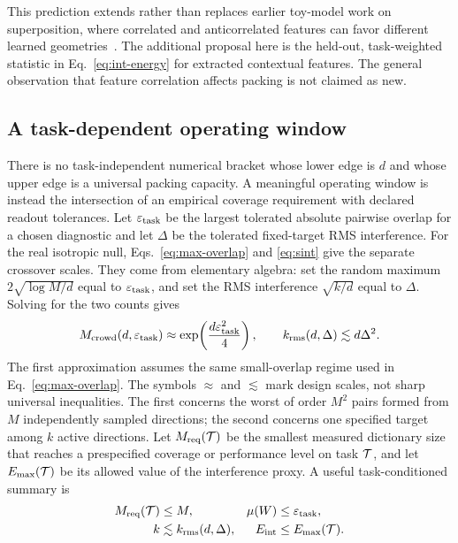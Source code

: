 \documentclass[
  aps,
  reprint,
  superscriptaddress,
  floatfix,
  nofootinbib,
  longbibliography
]{revtex4-2}
\newcommand{\Msem}{M}
\newcommand{\Eint}{E_{\mathrm{int}}}
\begin{document}
This prediction extends rather than replaces earlier toy-model work on
superposition, where correlated and anticorrelated features can favor different
learned geometries~\cite{elhage2022superposition}.  The additional proposal
here is the held-out, task-weighted statistic in Eq.~\eqref{eq:int-energy} for
extracted contextual features.  The general observation that feature
correlation affects packing is not claimed as new.

\subsection{A task-dependent operating window}
\label{sec:operating-criterion}

There is no task-independent numerical bracket whose lower edge is $d$ and
whose upper edge is a universal packing capacity.  A meaningful operating
window is instead the intersection of an empirical coverage requirement with
declared readout tolerances.  Let $\varepsilon_{\rm task}$ be the largest
tolerated absolute pairwise overlap for a chosen diagnostic and let $\Delta$ be the
tolerated fixed-target RMS interference.  For the real isotropic null,
Eqs.~\eqref{eq:max-overlap} and \eqref{eq:sint} give the separate crossover
scales.  They come from elementary algebra: set the random maximum
$2\sqrt{\log\Msem/d}$ equal to $\varepsilon_{\rm task}$, and set the RMS
interference $\sqrt{k/d}$ equal to $\Delta$.  Solving for the two counts gives
\begin{equation}
\label{eq:dual}
M_{\rm crowd}(d,\varepsilon_{\rm task})
\approx
\exp\!\left(\frac{d\varepsilon_{\rm task}^2}{4}\right),
\qquad
k_{\rm rms}(d,\Delta)
\lesssim d\Delta^2.
\end{equation}
The first approximation assumes the same small-overlap regime used in
Eq.~\eqref{eq:max-overlap}.  The symbols $\approx$ and $\lesssim$ mark design
scales, not sharp universal inequalities.
The first concerns the worst of order $\Msem^2$ pairs formed from $\Msem$
independently sampled directions; the second concerns one specified target
among $k$ active directions.
Let $M_{\rm req}({\cal T})$ be the smallest measured dictionary size that
reaches a prespecified coverage or performance level on task ${\cal T}$, and
let $E_{\max}({\cal T})$ be its allowed value of the interference proxy.  A
useful task-conditioned summary is
\begin{equation}
\label{eq:gold-task}
\begin{aligned}
M_{\rm req}({\cal T})&\leq \Msem,
&\mu(W)&\leq\varepsilon_{\rm task},\\
k&\lesssim k_{\rm rms}(d,\Delta),
&\Eint&\leq E_{\max}({\cal T}).
\end{aligned}
\end{equation}
\end{document}
